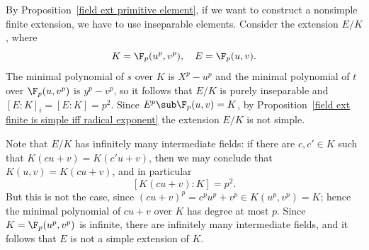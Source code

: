 \begin{example}
By Proposition~\ref{field ext primitive element}, if we want to construct a nonsimple finite extension, we have to use inseparable elements. Consider the extension $E/K$, where
\[K=\F_p(u^p,v^p),\quad E=\F_p(u,v).\]
The minimal polynomial of $s$ over $K$ is $X^p-u^p$ and the minimal polynomial of $t$ over $\F_p(u,v^p)$ is $y^p-v^p$, so it follows that $E/K$ is purely inseparable and $[E:K]_i=[E:K]=p^2$. Since $E^p\sub\F_p(u,v)=K$, by Proposition~\ref{field ext finite is simple iff radical exponent} the extension $E/K$ is not simple.\par
Note that $E/K$ has infinitely many intermediate fields: if there are $c,c'\in K$ such that $K(cu+v)=K(c'u+v)$, then we may conclude that $K(u,v)=K(cu+v)$, and in particular
\[[K(cu+v):K]=p^2.\]
But this is not the case, since $(cu+v)^p=c^pu^p+v^p\in K(u^p,v^p)=K$; hence the minimal polynomial of $cu+v$ over $K$ has degree at most $p$. Since $K=\F_p(u^p,v^p)$ is infinite, there are infinitely many intermediate fields, and it follows that $E$ is not a simple extension of $K$.
\end{example}
